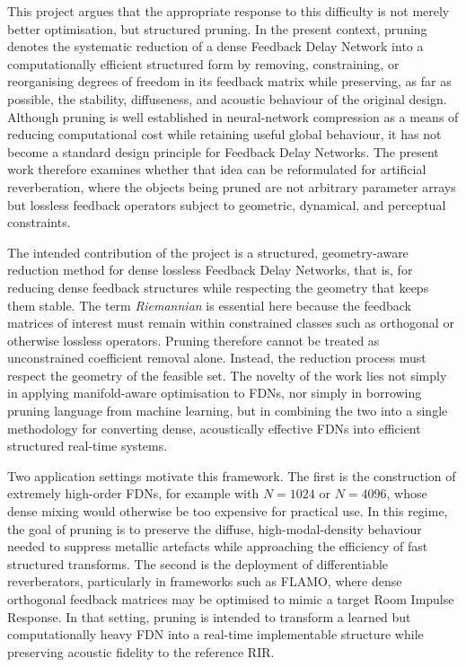 \documentclass[12pt,a4paper]{article}
\begin{document}
This project argues that the appropriate response to this difficulty is not merely
better optimisation, but structured pruning. In the present context, pruning
denotes the systematic reduction of a dense Feedback Delay Network into a
computationally efficient structured form by removing, constraining, or
reorganising degrees of freedom in its feedback matrix while preserving, as far
as possible, the stability, diffuseness, and acoustic behaviour of the original
design. Although pruning is well established in neural-network compression as a
means of reducing computational cost while retaining useful global behaviour, it
has not become a standard design principle for Feedback Delay Networks. The
present work therefore examines whether that idea can be reformulated for
artificial reverberation, where the objects being pruned are not arbitrary
parameter arrays but lossless feedback operators subject to geometric,
dynamical, and perceptual constraints.

The intended contribution of the project is a structured, geometry-aware
reduction method for dense lossless Feedback Delay Networks, that is, for
reducing dense feedback structures while respecting the geometry that keeps them
stable. The term
\emph{Riemannian} is essential here because the feedback matrices of
interest must remain within constrained classes such as orthogonal or otherwise
lossless operators. Pruning therefore cannot be treated as unconstrained
coefficient removal alone. Instead, the reduction process must respect the geometry
of the feasible set. The novelty of the work lies not simply in applying
manifold-aware optimisation to FDNs, nor simply in borrowing pruning language
from machine learning, but in combining the two into a single methodology for
converting dense, acoustically effective FDNs into efficient structured real-time
systems.

Two application settings motivate this framework. The first is the construction
of extremely high-order FDNs, for example with $N=1024$ or $N=4096$, whose dense
mixing would otherwise be too expensive for practical use. In this regime, the
goal of pruning is to preserve the diffuse, high-modal-density behaviour needed
to suppress metallic artefacts while approaching the efficiency of fast
structured transforms. The second is the deployment of differentiable
reverberators, particularly in frameworks such as FLAMO, where dense orthogonal
feedback matrices may be optimised to mimic a target Room Impulse Response. In
that setting, pruning is intended to transform a learned but computationally
heavy FDN into a real-time implementable structure while preserving acoustic
fidelity to the reference RIR.
\end{document}
